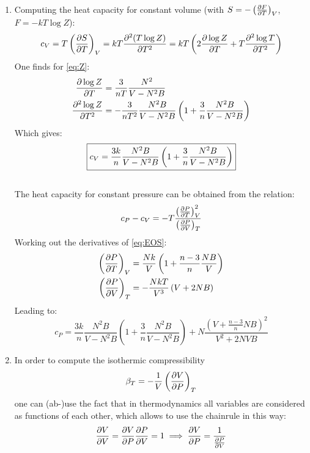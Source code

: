 \documentclass[11pt,a4paper]{scrartcl}
\newcommand{\thermpart}[3]{\left(\pdv{#1}{#2}\right)_{#3}}
\begin{document}
\begin{enumerate}[label=\textbf{\large(\alph*)}, itemsep=2\baselineskip]
\item
    Computing the heat capacity for constant volume (with
    $S=-\thermpart{F}{T}{V}$, $F=-kT\log{Z}$):
    \begin{equation*}
        c_{V}=T\thermpart{S}{T}{V}=kT\pdv[2]{(T\log{Z})}{T}
        =kT\left(2\pdv{\log{Z}}{T}+T\pdv[2]{\log{T}}{T}\right)
    \end{equation*}
    One finds for \eqref{eq:Z}:
    \begin{align*}
        \pdv{\log{Z}}{T}&=\frac{3}{nT}\frac{N^2}{V-N^2B} \\
        \pdv[2]{\log{Z}}{T}&=-\frac{3}{nT^2}\frac{N^2B}{V-N^2B}\left(1+\frac{3}{n}\frac{N^2B}{V-N^2B}\right)
    \end{align*}
    Which gives:
    \begin{equation}
        \boxed{%
        c_{V}=\frac{3k}{n}\frac{N^2B}{V-N^2B}\left(1+\frac{3}{n}\frac{N^2B}{V-N^2B}\right)}
        \label{eq:cv}
    \end{equation} \\

    The heat capacity for constant pressure can be obtained from the relation:
    \begin{equation*}
        c_{P}-c_{V}=-T\frac{\thermpart{P}{T}{V}^2}{\thermpart{P}{V}{T}}
    \end{equation*}
    Working out the derivatives of \eqref{eq:EOS}:
    \begin{align*}
        \thermpart{P}{T}{V}&=\frac{Nk}{V}\left(1+\frac{n-3}{n}\frac{NB}{V}\right)
        \\
        \thermpart{P}{V}{T}&=-\frac{NkT}{V^3}\left(V+2NB\right)
    \end{align*}
    Leading to:
    \begin{equation}
        c_{P}=\frac{3k}{n}\frac{N^2B}{V-N^2B}\left(1+\frac{3}{n}\frac{N^2B}{V-N^2B}\right)+N\frac{\left(V+\frac{n-3}{n}NB\right)^2}{V^2+2NVB}
        \label{eq:cp}
    \end{equation}


\item
    In order to compute the isothermic compressibility
    \begin{equation*}
        \beta_{T}=-\frac{1}{V}\thermpart{V}{P}{T}
    \end{equation*}
    one can (ab-)use the fact that in thermodynamics all variables are
    considered as functions of each other, which allows to use the chainrule in
    this way:
    \begin{equation*}
        \pdv{V}{V}=\pdv{V}{P}\pdv{P}{V}=1\implies\pdv{V}{P}=\frac{1}{\pdv{P}{V}}
    \end{equation*}


\end{enumerate}
\end{document}
